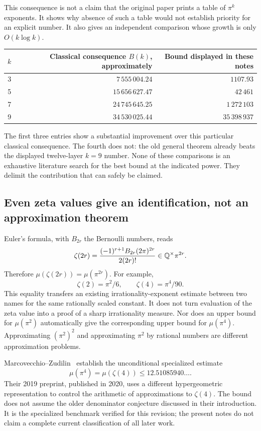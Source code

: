 This consequence is not a claim that the original paper prints a
table of \(\pi^k\) exponents. It shows why absence of such a table
would not establish priority for an explicit number. It also gives
an independent comparison whose growth is only \(O(k\log k)\).

\begin{center}
\begin{tabular}{rrr}
\toprule
\(k\)&Classical consequence \(B(k)\), approximately
 &Bound displayed in these notes\\
\midrule
3&\(7\,555\,004.24\)&\(1107.93\)\\
5&\(15\,656\,627.47\)&\(42\,461\)\\
7&\(24\,745\,645.25\)&\(1\,272\,103\)\\
9&\(34\,530\,025.44\)&\(35\,398\,937\)\\
\bottomrule
\end{tabular}
\end{center}

The first three entries show a substantial improvement over this
particular classical consequence. The fourth does not: the old
general theorem already beats the displayed twelve-layer \(k=9\)
number. None of these comparisons is an exhaustive literature
search for the best bound at the indicated power. They delimit the
contribution that can safely be claimed.

\subsection{Even zeta values give an identification, not an approximation theorem}

Euler's formula, with \(B_{2r}\) the Bernoulli numbers, reads
\[
\zeta(2r)=\frac{(-1)^{r+1}B_{2r}(2\pi)^{2r}}{2(2r)!}
\in\mathbb Q^\times\pi^{2r}.
\]
Therefore \(\mu(\zeta(2r))=\mu(\pi^{2r})\). For example,
\[
\zeta(2)=\pi^2/6,\qquad \zeta(4)=\pi^4/90.
\]
This equality transfers an existing irrationality-exponent estimate
between two names for the same rationally scaled constant. It does
not turn evaluation of the zeta value into a proof of a sharp
irrationality measure. Nor does an upper bound for \(\mu(\pi^2)\)
automatically give the corresponding upper bound for \(\mu(\pi^4)\).
Approximating \((\pi^2)^2\) and approximating \(\pi^2\) by rational
numbers are different approximation problems.

Marcovecchio--Zudilin~\cite{MarcovecchioZudilin} establish the
unconditional specialized estimate
\begin{equation}\label{eq:zeta4benchmark}
\mu(\pi^4)=\mu(\zeta(4))\le12.51085940\ldots.
\end{equation}
Their 2019 preprint, published in 2020, uses a different
hypergeometric representation to control the arithmetic of
approximations to \(\zeta(4)\). The bound does not assume the older
denominator conjecture discussed in their introduction. It is the
specialized benchmark verified for this revision; the present notes
do not claim a complete current classification of all later work.

